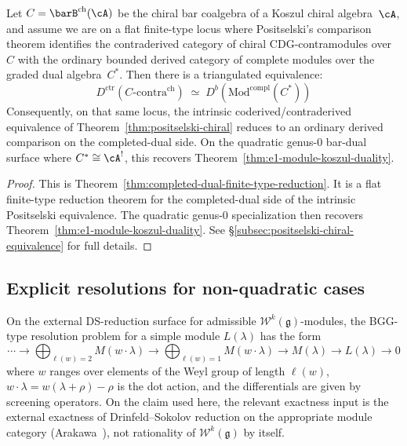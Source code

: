 \begin{theorem}
\label{thm:completed-dual-finite-type-reduction-kp}
Let $C=\barB^{\mathrm{ch}}(\cA)$ be the chiral bar coalgebra of a
Koszul chiral algebra~$\cA$, and assume we are on a flat finite-type
locus where Positselski's comparison theorem identifies the
contraderived category of chiral CDG-contramodules over~$C$ with the
ordinary bounded derived category of complete modules over the graded
dual algebra~$C^*$. Then there is a triangulated equivalence:
\begin{equation}\label{eq:completed-dual-finite-type-reduction-kp}
D^{\mathrm{ctr}}(C\text{-}\mathrm{contra}^{\mathrm{ch}})
\;\simeq\;
D^b(\mathrm{Mod}^{\mathrm{compl}}(C^*))
\end{equation}
Consequently, on that same locus, the intrinsic coderived/contraderived
equivalence of Theorem~\textup{\ref{thm:positselski-chiral}} reduces to
an ordinary derived comparison on the completed-dual side. On the
quadratic genus-$0$ bar-dual surface where $C^*\cong\cA^!$, this
recovers Theorem~\textup{\ref{thm:e1-module-koszul-duality}}.
\end{theorem}

\begin{proof}
This is Theorem~\ref{thm:completed-dual-finite-type-reduction}.
It is a flat finite-type reduction theorem for the completed-dual side
of the intrinsic Positselski equivalence. The quadratic genus-$0$
specialization then recovers
Theorem~\ref{thm:e1-module-koszul-duality}. See
\S\ref{subsec:positselski-chiral-equivalence} for full details.
\end{proof}

\subsection{Explicit resolutions for non-quadratic cases}

\begin{example}
On the external DS-reduction surface for admissible
$\mathcal{W}^k(\mathfrak{g})$-modules, the BGG-type resolution
problem for a simple module $L(\lambda)$ has the form
\[
\cdots \to \bigoplus_{\ell(w)=2} M(w \cdot \lambda) \to \bigoplus_{\ell(w)=1} M(w \cdot \lambda) \to M(\lambda) \to L(\lambda) \to 0
\]
where $w$ ranges over elements of the Weyl group of length $\ell(w)$,
$w \cdot \lambda = w(\lambda + \rho) - \rho$ is the dot action, and
the differentials are given by screening operators. On the
claim used here, the relevant exactness input is
the external exactness of Drinfeld--Sokolov reduction on the
appropriate module category \textup{(}Arakawa~\cite{Arakawa17}\textup{)},
not rationality of $\mathcal{W}^k(\mathfrak{g})$ by itself.
\end{example}

